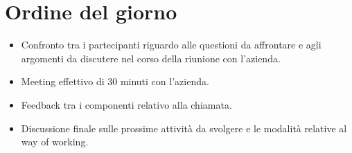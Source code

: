 \section{Ordine del giorno}
\begin{itemize}
    \item Confronto tra i partecipanti riguardo alle questioni da affrontare e agli argomenti da discutere nel corso della riunione con l'azienda.
    \item Meeting effettivo di 30 minuti con l'azienda.
    \item Feedback tra i componenti relativo alla chiamata.
    \item Discussione finale sulle prossime attività da svolgere e le modalità relative al way of working.
\end{itemize}